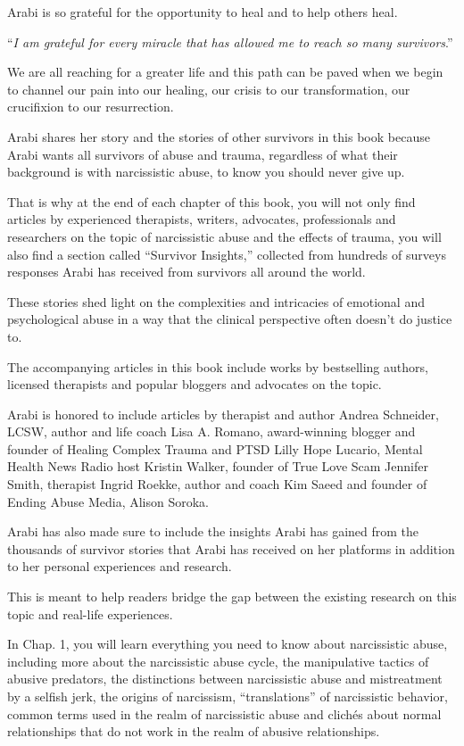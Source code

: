 \documentclass[oneside]{book}
\numberwithin{equation}{section}
\begin{document}
%
Arabi is so grateful for the opportunity to heal and to help others heal.

``\textit{I am grateful for every miracle that has allowed me to reach so many survivors}.''

We are all reaching for a greater life and this path can be paved when we begin to channel our pain into our healing, our crisis to our transformation, our crucifixion to our resurrection.

Arabi shares her story and the stories of other survivors in this book because Arabi wants all survivors of abuse and trauma, regardless of what their background is with narcissistic abuse, to know you should never give up.

%
That is why at the end of each chapter of this book, you will not only find articles by experienced therapists, writers, advocates, professionals and researchers on the topic of narcissistic abuse and the effects of trauma, you will also find a section called ``Survivor Insights,'' collected from hundreds of surveys responses Arabi has received from survivors all around the world.

These stories shed light on the complexities and intricacies of emotional and psychological abuse in a way that the clinical perspective often doesn't do justice to.

%
The accompanying articles in this book include works by bestselling authors, licensed therapists and popular bloggers and advocates on the topic.

Arabi is honored to include articles by therapist and author Andrea Schneider, LCSW, author and life coach Lisa A. Romano, award-winning blogger and founder of Healing Complex Trauma and PTSD Lilly Hope Lucario, Mental Health News Radio host Kristin Walker, founder of True Love Scam Jennifer Smith, therapist Ingrid Roekke, author and coach Kim Saeed and founder of Ending Abuse Media, Alison Soroka.

Arabi has also made sure to include the insights Arabi has gained from the thousands of survivor stories that Arabi has received on her platforms in addition to her personal experiences and research.

This is meant to help readers bridge the gap between the existing research on this topic and real-life experiences.

In Chap. 1, you will learn everything you need to know about narcissistic abuse, including more about the narcissistic abuse cycle, the manipulative tactics of abusive predators, the distinctions between narcissistic abuse and mistreatment by a selfish jerk, the origins of narcissism, ``translations'' of narcissistic behavior, common terms used in the realm of narcissistic abuse and clich\'es about normal relationships that do not work in the realm of abusive relationships.
\end{document}
